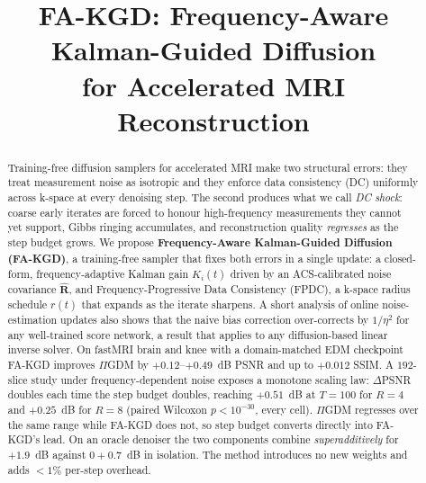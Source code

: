 \documentclass[conference]{IEEEtran}
\newcommand{\hatR}{\hat{\mathbf{R}}}
\begin{document}
\title{FA-KGD: Frequency-Aware Kalman-Guided Diffusion\\
for Accelerated MRI Reconstruction}


\maketitle

\begin{abstract}
Training-free diffusion samplers for accelerated MRI make two structural
errors: they treat measurement noise as isotropic and they enforce data
consistency (DC) uniformly across k-space at every denoising step. The
second produces what we call \emph{DC shock}: coarse early iterates are
forced to honour high-frequency measurements they cannot yet support,
Gibbs ringing accumulates, and reconstruction quality \emph{regresses} as
the step budget grows. We propose \textbf{Frequency-Aware Kalman-Guided
Diffusion (FA-KGD)}, a training-free sampler that fixes both errors in a
single update: a closed-form, frequency-adaptive Kalman gain $K_i(t)$
driven by an ACS-calibrated noise covariance $\hatR$, and
Frequency-Progressive Data Consistency (FPDC), a k-space radius schedule
$r(t)$ that expands as the iterate sharpens. A short analysis of online
noise-estimation updates also shows that the naive bias correction
over-corrects by $1/\eta^2$ for any well-trained score network, a result
that applies to any diffusion-based linear inverse solver.
On fastMRI brain and knee with a domain-matched EDM checkpoint FA-KGD
improves $\Pi$GDM by $+0.12$--$+0.49$~dB PSNR and up to $+0.012$ SSIM.
A $192$-slice study under frequency-dependent noise exposes a monotone
scaling law: $\Delta$PSNR doubles each time the step budget doubles,
reaching $+0.51$~dB at $T{=}100$ for $R{=}4$ and $+0.25$~dB for $R{=}8$
(paired Wilcoxon $p<10^{-30}$, every cell). $\Pi$GDM regresses over the
same range while FA-KGD does not, so step budget converts directly into
FA-KGD's lead. On an oracle denoiser the two components combine
\emph{superadditively} for $+1.9$~dB against $0+0.7$~dB in isolation. The
method introduces no new weights and adds $<\!1\%$ per-step overhead.
\end{abstract}
\end{document}
